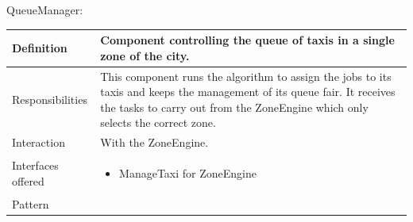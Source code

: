 \documentclass[a4paper,11pt]{report} %
\begin{document}
	\centerline{QueueManager:}
	\begin{center}
		\begin{tabular}{| l | p{9cm} |}\hline
			Definition & Component controlling the queue of taxis in a single zone of the city.\\\hline
			Responsibilities & This component runs the algorithm to assign the jobs to its taxis and keeps the management of its queue fair. It receives the tasks to carry out from the ZoneEngine which only selects the correct zone.\\\hline
			Interaction & With the ZoneEngine.\\\hline
			Interfaces offered & \begin{itemize}
				\item ManageTaxi for ZoneEngine
			\end{itemize}\\\hline
			Pattern & \\\hline
		\end{tabular}
	\end{center}	
	
	\pagebreak
\end{document}

